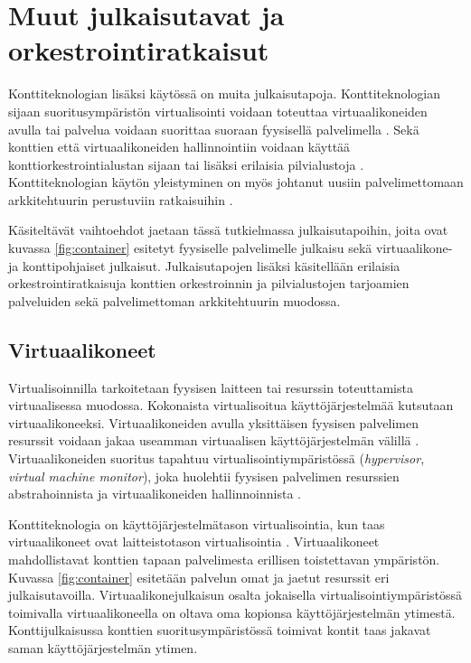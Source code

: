 \chapter{Muut julkaisutavat ja orkestrointiratkaisut\label{options}}

Konttiteknologian lisäksi käytössä on muita julkaisutapoja.
Konttiteknologian sijaan suoritusympäristön virtualisointi voidaan toteuttaa virtuaalikoneiden avulla tai palvelua voidaan suorittaa suoraan fyysisellä palvelimella \cite{Watada19}.
Sekä konttien että virtuaalikoneiden hallinnointiin voidaan käyttää konttiorkestrointialustan sijaan tai lisäksi erilaisia pilvialustoja \cite{Bousselmi14}.
Konttiteknologian käytön yleistyminen on myös johtanut uusiin palvelimettomaan arkkitehtuurin perustuviin ratkaisuihin \cite{Baldini17}.

Käsiteltävät vaihtoehdot jaetaan tässä tutkielmassa julkaisutapoihin, joita ovat kuvassa \ref{fig:container} esitetyt fyysiselle palvelimelle julkaisu sekä virtuaalikone- ja konttipohjaiset julkaisut.
Julkaisutapojen lisäksi käsitellään erilaisia orkestrointiratkaisuja konttien orkestroinnin ja pilvialustojen tarjoamien palveluiden sekä palvelimettoman arkkitehtuurin muodossa.

\section{Virtuaalikoneet}

Virtualisoinnilla tarkoitetaan fyysisen laitteen tai resurssin toteuttamista virtuaalisessa muodossa.
Kokonaista virtualisoitua käyttöjärjestelmää kutsutaan virtuaalikoneeksi.
Virtuaalikoneiden avulla yksittäisen fyysisen palvelimen resurssit voidaan jakaa useamman virtuaalisen käyttöjärjestelmän välillä \cite{Smith05}.
Virtuaalikoneiden suoritus tapahtuu virtualisointiympäristössä (\textit{hypervisor}, \textit{virtual machine monitor}), joka huolehtii fyysisen palvelimen resurssien abstrahoinnista ja virtuaalikoneiden hallinnoinnista \cite{desai13}.

Konttiteknologia on käyttöjärjestelmätason virtualisointia, kun taas virtuaalikoneet ovat laitteistotason virtualisointia \cite{Compastie20}.
Virtuaalikoneet mahdollistavat konttien tapaan palvelimesta erillisen toistettavan ympäristön.
Kuvassa \ref{fig:container} esitetään palvelun omat ja jaetut resurssit eri julkaisutavoilla.
Virtuaalikonejulkaisun osalta jokaisella virtualisointiympäristössä toimivalla virtuaalikoneella on oltava oma kopionsa käyttöjärjestelmän ytimestä.
Konttijulkaisussa konttien suoritusympäristössä toimivat kontit taas jakavat saman käyttöjärjestelmän ytimen.

